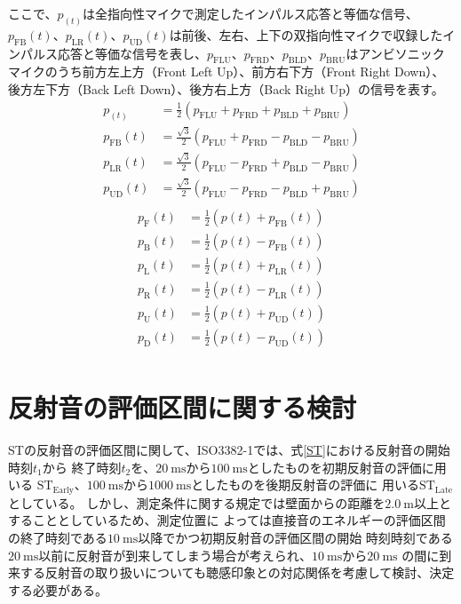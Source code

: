 \documentclass[11pt,a4j]{jreport}
\begin{document}
ここで、$p_(t)$は全指向性マイクで測定したインパルス応答と等価な信号、$p_{\mathrm{FB}}(t)$、$p_{\mathrm{LR}}(t)$、$p_{\mathrm{UD}}(t)$は前後、左右、上下の双指向性マイクで収録したインパルス応答と等価な信号を表し、$p_{\mathrm{FLU}}$、$p_{\mathrm{FRD}}$、$p_{\mathrm{BLD}}$、$p_{\mathrm{BRU}}$はアンビソニックマイクのうち前方左上方（Front Left Up）、前方右下方（Front Right Down）、後方左下方（Back Left Down）、後方右上方（Back Right Up）の信号を表す。
\begin{equation}
  \label{ambisonicAtoB}
  \begin{alignedat}{4}
    p_(t) &= \frac{1}{2} (p_{\mathrm{FLU}} + p_{\mathrm{FRD}} + p_{\mathrm{BLD}} + p_{\mathrm{BRU}})
    \\
    p_{\mathrm{FB}}(t) &= \frac{\sqrt{3}}{2} (p_{\mathrm{FLU}} + p_{\mathrm{FRD}} - p_{\mathrm{BLD}} - p_{\mathrm{BRU}})
    \\
    p_{\mathrm{LR}}(t) &= \frac{\sqrt{3}}{2} (p_{\mathrm{FLU}} - p_{\mathrm{FRD}} + p_{\mathrm{BLD}} - p_{\mathrm{BRU}})
    \\
    p_{\mathrm{UD}}(t) &= \frac{\sqrt{3}}{2} (p_{\mathrm{FLU}} - p_{\mathrm{FRD}} - p_{\mathrm{BLD}} + p_{\mathrm{BRU}})
    \\
  \end{alignedat}
\end{equation}
\begin{equation}
  \label{ambisonicBtoDir}
  \begin{alignedat}{6}
    p_{\mathrm{F}}(t) &= \frac{1}{2} (p(t) + p_{\mathrm{FB}}(t))
    \\
    p_{\mathrm{B}}(t) &= \frac{1}{2} (p(t) - p_{\mathrm{FB}}(t))
    \\
    p_{\mathrm{L}}(t) &= \frac{1}{2} (p(t) + p_{\mathrm{LR}}(t))
    \\
    p_{\mathrm{R}}(t) &= \frac{1}{2} (p(t) - p_{\mathrm{LR}}(t))
    \\
    p_{\mathrm{U}}(t) &= \frac{1}{2} (p(t) + p_{\mathrm{UD}}(t))
    \\
    p_{\mathrm{D}}(t) &= \frac{1}{2} (p(t) - p_{\mathrm{UD}}(t)) \\
  \end{alignedat}
\end{equation}
  \newpage
  \section{反射音の評価区間に関する検討}
    STの反射音の評価区間に関して、ISO3382-1では、式\ref{ST}における反射音の開始時刻$t_{1}$から
    終了時刻$t_{2}$を、$\SI{20}{\ms}$から$\SI{100}{\ms}$としたものを初期反射音の評価に用いる
    $\mathrm{ST_{Early}}$、$\SI{100}{\ms}$から$\SI{1000}{\ms}$としたものを後期反射音の評価に
    用いる$\mathrm{ST_{Late}}$としている。
    しかし、測定条件に関する規定では壁面からの距離を$\SI{2.0}{\m}$以上とすることとしているため、測定位置に
    よっては直接音のエネルギーの評価区間の終了時刻である$\SI{10}{\ms}$以降でかつ初期反射音の評価区間の開始
    時刻時刻である$\SI{20}{\ms}$以前に反射音が到来してしまう場合が考えられ、$\SI{10}{\ms}$から$\SI{20}{\ms}$
    の間に到来する反射音の取り扱いについても聴感印象との対応関係を考慮して検討、決定する必要がある。
   
\end{document}
